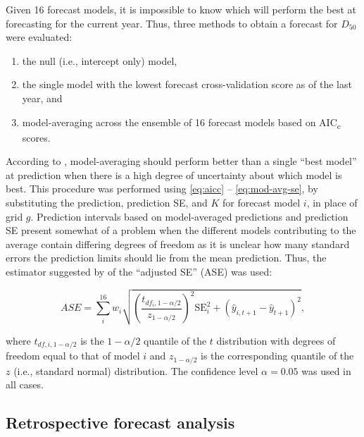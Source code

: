 \documentclass[12pt,]{book}
\providecommand{\tightlist}{%
  \setlength{\itemsep}{0pt}\setlength{\parskip}{0pt}}
\theoremstyle{definition}
\theoremstyle{definition}
\theoremstyle{definition}
\theoremstyle{remark}
\begin{document}
\noindent
Given 16 forecast models, it is impossible to know which will perform
the best at forecasting for the current year. Thus, three methods to
obtain a forecast for \(D_{50}\) were evaluated:

\begin{enumerate}
\def\labelenumi{(\arabic{enumi})}
\tightlist
\item
  the null (i.e., intercept only) model,
\item
  the single model with the lowest forecast cross-validation score as of
  the last year, and
\item
  model-averaging across the ensemble of 16 forecast models based on
  AIC\textsubscript{c} scores.
\end{enumerate}

\noindent
According to \citet{burnham-anderson-2002}, model-averaging should
perform better than a single ``best model'' at prediction when there is
a high degree of uncertainty about which model is best. This procedure
was performed using \eqref{eq:aicc} -- \eqref{eq:mod-avg-se}, by
substituting the prediction, prediction SE, and \(K\) for forecast model
\(i\), in place of grid \(g\). Prediction intervals based on
model-averaged predictions and prediction SE present somewhat of a
problem when the different models contributing to the average contain
differing degrees of freedom as it is unclear how many standard errors
the prediction limits should lie from the mean prediction. Thus, the
estimator suggested by \citet{burnham-anderson-2002} of the ``adjusted
SE'' (ASE) was used:

\begin{equation}
  ASE=\sum_i^{16} w_i \sqrt{\left(\frac{t_{df_i,1-\alpha/2}}{z_{1-\alpha/2}}\right)^2 \text{SE}_i^2+(\hat{y}_{i,t+1}-\hat{y}_{t+1})^2},
\label{eq:ase}
\end{equation}

\noindent
where \(t_{df,i,1-\alpha/2}\) is the \(1-\alpha/2\) quantile of the
\(t\) distribution with degrees of freedom equal to that of model \(i\)
and \(z_{1-\alpha/2}\) is the corresponding quantile of the \(z\) (i.e.,
standard normal) distribution. The confidence level \(\alpha = 0.05\)
was used in all cases.

\subsection{Retrospective forecast analysis}\label{retro}
\end{document}
